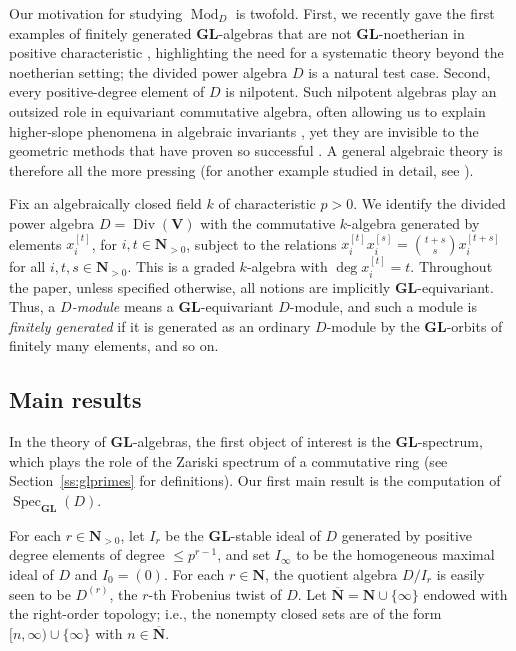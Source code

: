\documentclass[12pt]{amsart}
\newcommand{\bN}{\mathbf{N}}
\newcommand{\bV}{\mathbf{V}}
\DeclareMathOperator{\Div}{Div}
\DeclareMathOperator{\Spec}{Spec}
\DeclareMathOperator{\Mod}{Mod}
\newcommand{\Dr}{D^{(r)}}
\newcommand{\GL}{\mathbf{GL}}
\numberwithin{equation}{section}
\theoremstyle{definition}
\theoremstyle{plain}
\begin{document}
Our motivation for studying $\Mod_D$ is twofold. First, we recently gave the first examples of finitely generated $\GL$-algebras that are not $\GL$-noetherian in positive characteristic \cite{gan24non, gan25non}, highlighting the need for a systematic theory beyond the noetherian setting; the divided power algebra $D$ is a natural test case. Second, every positive-degree element of $D$ is nilpotent. Such nilpotent algebras play an outsized role in equivariant commutative algebra, often allowing us to explain higher-slope phenomena in algebraic invariants \cite{gan24lnnr}, yet they are invisible to the geometric methods that have proven so successful \cite{bdes21geo, bds24charp, bdes23uni}. A general algebraic theory is therefore all the more pressing (for another example studied in detail, see \cite{nsy25symm}).

Fix an algebraically closed field $k$ of characteristic $p > 0$. We identify the divided power algebra $D = \Div(\bV)$ with the commutative $k$-algebra generated by elements $x_i^{[t]}$, for $i, t \in \mathbf{N}_{>0}$, subject to the relations $x_i^{[t]}x_i^{[s]} = \binom{t+s}{s} x_i^{[t+s]}$ for all $i, t, s \in \mathbf{N}_{>0}$. This is a graded $k$-algebra with $\deg x_i^{[t]} = t$. 
Throughout the paper, unless specified otherwise, all notions are implicitly $\GL$-equivariant. Thus, a \textit{$D$-module} means a $\GL$-equivariant $D$-module, and such a module is \textit{finitely generated} if it is generated as an ordinary $D$-module by the $\GL$-orbits of finitely many elements, and so on.

\subsection{Main results}
In the theory of $\GL$-algebras, the first object of interest is the $\GL$-spectrum, which plays the role of the Zariski spectrum of a commutative ring (see Section~\ref{ss:glprimes} for definitions). Our first main result is the computation of $\Spec_{\GL}(D)$.

For each $r \in \mathbf{N}_{>0}$, let $I_r$ be the $\GL$-stable ideal of $D$ generated by positive degree elements of degree $\leq p^{r-1}$, and set $I_{\infty}$ to be the homogeneous maximal ideal of $D$ and $I_0 = (0)$. For each $r \in \bN$, the quotient algebra $D/I_r$ is easily seen to be $\Dr$, the $r$-th Frobenius twist of $D$. Let $\overline{\bN} = \bN \cup \{ \infty\}$ endowed with the right-order topology; i.e., the nonempty closed sets are of the form $[n, \infty) \cup \{\infty\}$ with $n \in \overline{\bN}$. 
\end{document}
